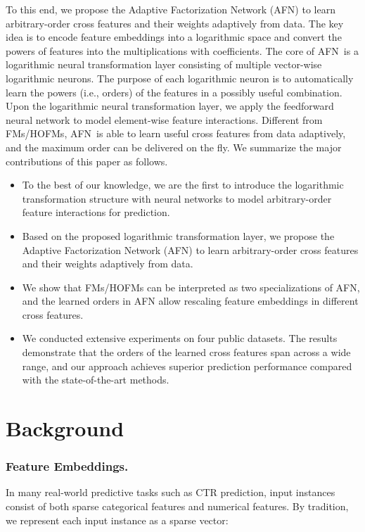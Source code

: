 \documentclass[letterpaper]{article} \usepackage{aaai20}  \usepackage{times}  \usepackage{helvet} \usepackage{courier}  \usepackage[hyphens]{url}  \usepackage{graphicx} \urlstyle{rm} \def\UrlFont{\rm}  \usepackage{graphicx}  \frenchspacing  \setlength{\pdfpagewidth}{8.5in}  \setlength{\pdfpageheight}{11in}
\newcommand{\model}{{AFN}~}
\newcommand{\modelns}{{AFN}}
\begin{document}
To this end, we propose the Adaptive Factorization Network (\modelns) to learn arbitrary-order cross features and their weights adaptively from data. The key idea is to encode feature embeddings into a logarithmic space and convert the powers of features into the multiplications with coefficients. 
The core of \model is a logarithmic neural transformation layer consisting of multiple vector-wise logarithmic neurons. The purpose of each logarithmic neuron is to automatically learn the powers (i.e., orders) of the features in a possibly useful combination. 
Upon the logarithmic neural transformation layer, we apply the feedforward neural network to model element-wise feature interactions.
Different from FMs/HOFMs, \model is able to learn useful cross features from data adaptively, and the maximum order can be delivered on the fly. 
We summarize the major contributions of this paper as follows. 
\begin{itemize}
\item To the best of our knowledge, we are the first to introduce the logarithmic transformation structure with neural networks to model arbitrary-order feature interactions for prediction.
\item Based on the proposed logarithmic transformation layer, we propose the Adaptive Factorization Network (\modelns) to learn arbitrary-order cross features and their weights adaptively from data.
\item We show that FMs/HOFMs can be interpreted as two specializations of AFN, and the learned orders in AFN allow rescaling feature embeddings in different cross features.
\item We conducted extensive experiments on four public datasets. The results demonstrate that the orders of the learned cross features span across a wide range, and our approach achieves superior prediction performance compared with the state-of-the-art methods.
\end{itemize}


\section{Background}
\label{sec:background}

\subsubsection{Feature Embeddings.}
In many real-world predictive tasks such as CTR prediction, input instances consist of both sparse categorical features and numerical features.
By tradition, we represent each input instance as a sparse vector:
\end{document}

